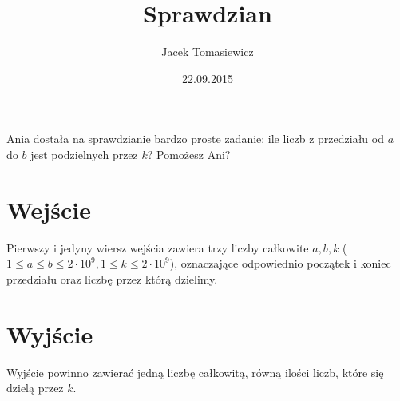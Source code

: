 \documentclass[zad,zawodnik,utf8]{sinol}
\title{Sprawdzian}
\author{Jacek Tomasiewicz}
\date{22.09.2015}
\begin{document}
  \begin{tasktext}%
Ania dostała na sprawdzianie bardzo proste zadanie: ile liczb z przedziału od $a$ do $b$ jest  podzielnych przez $k$? Pomożesz Ani?

  \section{Wejście}
Pierwszy i jedyny wiersz wejścia zawiera trzy liczby całkowite $a, b, k$ ($1 \leq a \leq b \leq 2 \cdot 10^9, 1  \leq k \leq 2 \cdot 10^9$), oznaczające odpowiednio początek i koniec przedziału oraz liczbę przez  którą dzielimy.

  \section{Wyjście}
Wyjście powinno zawierać jedną liczbę całkowitą, równą ilości liczb, które się dzielą przez $k$.

     \makecompactexample

  \end{tasktext}
\end{document}
